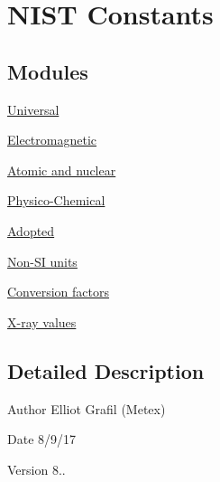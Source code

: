 \hypertarget{group___n_i_s_t_const}{}\section{N\+I\+ST Constants}
\label{group___n_i_s_t_const}
\subsection*{Modules}
\begin{DoxyCompactItemize}
\item 
\hyperlink{group___universal}{Universal}
\item 
\hyperlink{group___electromagnetic}{Electromagnetic}
\item 
\hyperlink{group___atomic}{Atomic and nuclear}
\item 
\hyperlink{group___physico_chemical}{Physico-\/\+Chemical}
\item 
\hyperlink{group___adopted}{Adopted}
\item 
\hyperlink{group___non-_s_i}{Non-\/\+S\+I units}
\item 
\hyperlink{group___conversion_factors}{Conversion factors}
\item 
\hyperlink{group___x-ray}{X-\/ray values}
\end{DoxyCompactItemize}


\subsection{Detailed Description}
\begin{DoxyAuthor}{Author}
Elliot Grafil (Metex) 
\end{DoxyAuthor}
\begin{DoxyDate}{Date}
8/9/17 
\end{DoxyDate}
\begin{DoxyVersion}{Version}
8.. 
\end{DoxyVersion}
